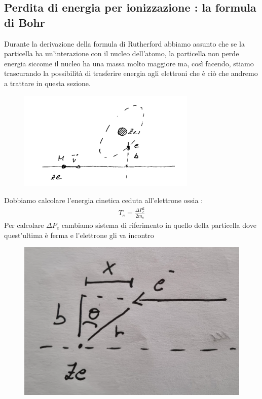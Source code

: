 \subsection{Perdita di energia per ionizzazione : la formula di Bohr}
Durante la derivazione della formula di Rutherford abbiamo assunto che se la particella ha un'interazione con il nucleo dell'atomo, la particella non perde 
energia siccome il nucleo ha una massa molto maggiore ma, così facendo, stiamo trascurando la possibilità di trasferire energia agli elettroni che è ciò che 
andremo a trattare in questa sezione.\\
\begin{figure}[!h]
    \centering
    \includegraphics[scale=0.5]{ch6InterazioneMateria/BohrInterazione}
\end{figure}
\newpage
Dobbiamo calcolare l'energia cinetica ceduta all'elettrone ossia : 
\begin{align*}
        T_{e} = \frac{\Delta P_{e}^2}{2m_{e}}
\end{align*}
Per calcolare $\Delta P_{e}$ cambiamo sistema di riferimento in quello della particella dove quest'ultima è ferma e l'elettrone gli va incontro 
\begin{figure}[!h]
    \centering
    \includegraphics[scale=0.5]{ch6InterazioneMateria/CambioRiferimento}
\end{figure}


